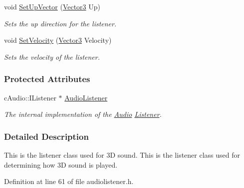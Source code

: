 \begin{DoxyCompactItemize}
void \hyperlink{classMezzanine_1_1Audio_1_1Listener_a0164474c3a9e10be3b040314e257bbc8}{SetUpVector} (\hyperlink{classMezzanine_1_1Vector3}{Vector3} Up)
\begin{DoxyCompactList}\small\item\em Sets the up direction for the listener. \item\end{DoxyCompactList}\item 
void \hyperlink{classMezzanine_1_1Audio_1_1Listener_abe15a6e98f8d04ecc82af40264a63170}{SetVelocity} (\hyperlink{classMezzanine_1_1Vector3}{Vector3} Velocity)
\begin{DoxyCompactList}\small\item\em Sets the velocity of the listener. \item\end{DoxyCompactList}\end{DoxyCompactItemize}
\subsubsection*{Protected Attributes}
\begin{DoxyCompactItemize}
\item 
\hypertarget{classMezzanine_1_1Audio_1_1Listener_a16d39f3bed8cea05266899d4aa47d6b5}{
cAudio::IListener $\ast$ \hyperlink{classMezzanine_1_1Audio_1_1Listener_a16d39f3bed8cea05266899d4aa47d6b5}{AudioListener}}
\label{classMezzanine_1_1Audio_1_1Listener_a16d39f3bed8cea05266899d4aa47d6b5}

\begin{DoxyCompactList}\small\item\em The internal implementation of the \hyperlink{namespaceMezzanine_1_1Audio}{Audio} \hyperlink{classMezzanine_1_1Audio_1_1Listener}{Listener}. \item\end{DoxyCompactList}\end{DoxyCompactItemize}


\subsubsection{Detailed Description}
This is the listener class used for 3D sound. This is the listener class used for determining how 3D sound is played. 

Definition at line 61 of file audiolistener.h.



